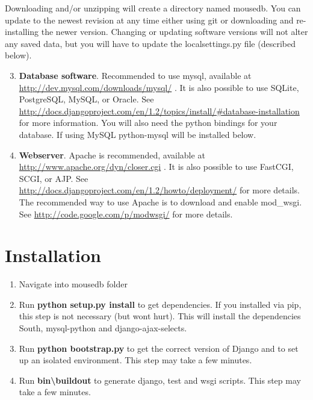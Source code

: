 \documentclass[letterpaper,10pt,english]{sphinxmanual}
\begin{document}
Downloading and/or unzipping will create a directory named mousedb.  You can update to the newest revision at any time either using git or downloading and re-installing the newer version.  Changing or updating software versions will not alter any saved data, but you will have to update the localsettings.py file (described below).
\begin{enumerate}
\setcounter{enumi}{2}
\item {} 
\textbf{Database software}.  Recommended to use mysql, available at \href{http://dev.mysql.com/downloads/mysql/}{http://dev.mysql.com/downloads/mysql/} .  It is also possible to use SQLite, PostgreSQL, MySQL, or Oracle.  See \href{http://docs.djangoproject.com/en/1.2/topics/install/\#database-installation}{http://docs.djangoproject.com/en/1.2/topics/install/\#database-installation} for more information.  You will also need the python bindings for your database.  If using MySQL python-mysql will be installed below.

\item {} 
\textbf{Webserver}.  Apache is recommended, available at \href{http://www.apache.org/dyn/closer.cgi}{http://www.apache.org/dyn/closer.cgi} .  It is also possible to use FastCGI, SCGI, or AJP.  See \href{http://docs.djangoproject.com/en/1.2/howto/deployment/}{http://docs.djangoproject.com/en/1.2/howto/deployment/} for more details.  The recommended way to use Apache is to download and enable mod\_wsgi.  See \href{http://code.google.com/p/modwsgi/}{http://code.google.com/p/modwsgi/} for more details.

\end{enumerate}


\section{Installation}
\label{installation:installation}\begin{enumerate}
\item {} 
Navigate into mousedb folder

\item {} 
Run \textbf{python setup.py install} to get dependencies.  If you installed via pip, this step is not necessary (but wont hurt).  This will install the dependencies South, mysql-python and django-ajax-selects.

\item {} 
Run \textbf{python bootstrap.py} to get the correct version of Django and to set up an isolated environment.  This step may take a few minutes.

\item {} 
Run \textbf{bin\textbackslash{}buildout} to generate django, test and wsgi scripts.  This step may take a few minutes.

\end{enumerate}
\end{document}

